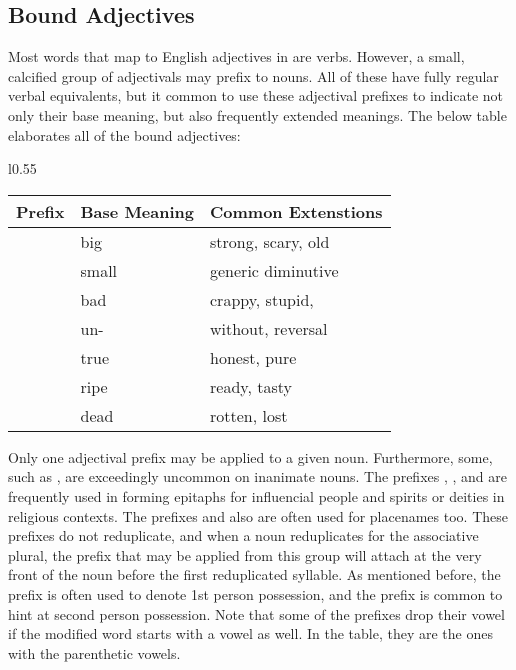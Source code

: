   \subsection{Bound Adjectives}
  Most words that map to English adjectives in \langname are verbs. However, a small, calcified group of adjectivals may prefix to nouns. All of these have fully regular verbal equivalents, but it common to use these adjectival prefixes to indicate not only their base meaning, but also frequently extended meanings. The below table elaborates all of the bound adjectives:
  \vertspace
  \begin{wrapfigure}{l}{0.55\textwidth}
    \begin{tabular}{|l|l|l|}
      \hline
      Prefix                   & Base Meaning & Common Extenstions   \\ \hline \hline
      \prefixtext{\boundbig}   & big          & strong, scary, old   \\
      \prefixtext{\boundsmall} & small        & generic diminutive   \\
      \prefixtext{\boundbad}   & bad          & crappy, stupid,      \\
      \prefixtext{\boundneg}   & un-          & without, reversal    \\
      \prefixtext{\boundtrue}  & true         & honest, pure         \\
      \prefixtext{\boundripe}  & ripe         & ready, tasty         \\
      \prefixtext{\bounddead}  & dead         & rotten, lost         \\ \hline
    \end{tabular}
  \end{wrapfigure}
  Only one adjectival prefix may be applied to a given noun. Furthermore, some, such as \prefixtext{\bounddead}, are exceedingly uncommon on inanimate nouns. The prefixes \prefixtext{\boundbig}, \prefixtext{\boundsmall}, and \prefixtext{\boundtrue} are frequently used in forming epitaphs for influencial people and spirits or deities in religious contexts. The prefixes \prefixtext{\boundripe} and \prefixtext{\boundbig} also are often used for placenames too. These prefixes do not reduplicate, and when a noun reduplicates for the associative plural, the prefix that may be applied from this group will attach at the very front of the noun before the first reduplicated syllable. As mentioned before, the \prefixtext{\boundbad} prefix is often used to denote 1st person possession, and the \prefixtext{\boundtrue} prefix is common to hint at second person possession. Note that some of the prefixes drop their vowel if the modified word starts with a vowel as well. In the table, they are the ones with the parenthetic vowels.
  \vertspace

